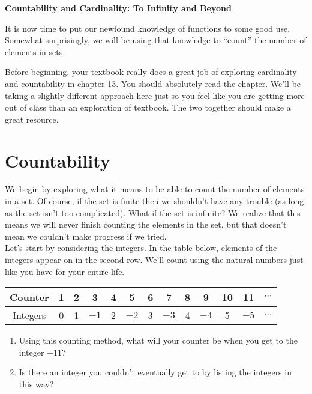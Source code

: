 \documentclass[12 pt]{article}
\theoremstyle{definition}
\theoremstyle{plain}
\theoremstyle{mytheorem}
\theoremstyle{myexample}
\theoremstyle{mydefinition}
\begin{document}
\begin{center}
\textbf{Countability and Cardinality: To Infinity and Beyond}
\end{center}

It is now time to put our newfound knowledge of functions to some good use.  Somewhat surprisingly, we will be using that knowledge to ``count'' the number of elements in sets.

\begin{center}
\end{center}


Before beginning, your textbook really does a great job of exploring cardinality and countability in chapter 13.  You should absolutely read the chapter.  We'll be taking a slightly different approach here just so you feel like you are getting more out of class than an exploration of textbook.  The two together should make a great resource.

\section{Countability}

We begin by exploring what it means to be able to count the number of elements in a set.  Of course, if the set is finite then we shouldn't have any trouble (as long as the set isn't too complicated).  What if the set is infinite?  We realize that this means we will never finish counting the elements in the set, but that doesn't mean we couldn't make progress if we tried.\\

Let's start by considering the integers.  In the table below, elements of the integers appear on in the second row.  We'll count using the natural numbers just like you have for your entire life.

\begin{center}
\begin{tabular}{c|cccccccccccc}
\hline
Counter & 1 & 2 & 3 & 4 & 5 & 6 & 7 & 8 & 9 & 10 &11 & $\cdots$\\
\hline
Integers & 0 &1 & $-1$ & 2 & $-2$ & 3 & $-3$ & 4 & $-4$ & 5 & $-5$ & $\cdots$\\
\hline
\end{tabular}
\label{tab:ints}
\end{center}
\begin{enumerate}
\item Using this counting method, what will your counter be when you get to the integer $-11$?

\vspace{1in}
\item Is there an integer you couldn't eventually get to by listing the integers in this way?

\vspace{1in}
\end{enumerate}
\end{document}
